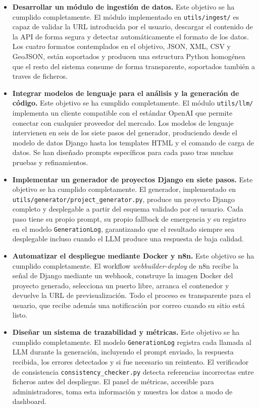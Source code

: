 \begin{itemize}
  \item \textbf{Desarrollar un módulo de ingestión de datos.} Este objetivo se ha cumplido completamente. El módulo implementado en \texttt{utils/ingest/} es capaz de validar la URL introducida por el usuario, descargar el contenido de la API de forma segura y detectar automáticamente el formato de los datos. Los cuatro formatos contemplados en el objetivo, JSON, XML, CSV y GeoJSON, están soportados y producen una estructura Python homogénea que el resto del sistema consume de forma transparente, soportados también a traves de ficheros.
  
  \item \textbf{Integrar modelos de lenguaje para el análisis y la generación de código.} Este objetivo se ha cumplido completamente. El módulo \texttt{utils/llm/} implementa un cliente compatible con el estándar OpenAI que permite conectar con cualquier proveedor del mercado. Los modelos de lenguaje intervienen en seis de los siete pasos del generador, produciendo desde el modelo de datos Django hasta los templates HTML y el comando de carga de datos. Se han diseñado prompts específicos para cada paso tras muchas pruebas y refinamientos.
  
  \item \textbf{Implementar un generador de proyectos Django en siete pasos.} Este objetivo se ha cumplido completamente. El generador, implementado en \texttt{utils/generator/project\_generator.py}, produce un proyecto Django completo y desplegable a partir del esquema validado por el usuario. Cada paso tiene su propio prompt, su propio fallback de emergencia y su registro en el modelo \texttt{GenerationLog}, garantizando que el resultado siempre sea desplegable incluso cuando el LLM produce una respuesta de baja calidad.
  
  \item \textbf{Automatizar el despliegue mediante Docker y n8n.} Este objetivo se ha cumplido completamente. El workflow \textit{webbuilder-deploy} de n8n recibe la señal de Django mediante un webhook, construye la imagen Docker del proyecto generado, selecciona un puerto libre, arranca el contenedor y devuelve la URL de previsualización. Todo el proceso es transparente para el usuario, que recibe además una notificación por correo cuando su sitio está listo.
  
  \item \textbf{Diseñar un sistema de trazabilidad y métricas.} Este objetivo se ha cumplido completamente. El modelo \texttt{GenerationLog} registra cada llamada al LLM durante la generación, incluyendo el prompt enviado, la respuesta recibida, los errores detectados y si fue necesario un reintento. El verificador de consistencia \texttt{consistency\_checker.py} detecta referencias incorrectas entre ficheros antes del despliegue. El panel de métricas, accesible para administradores, toma esta información y muestra los datos a modo de dashboard.
  

\end{itemize}
